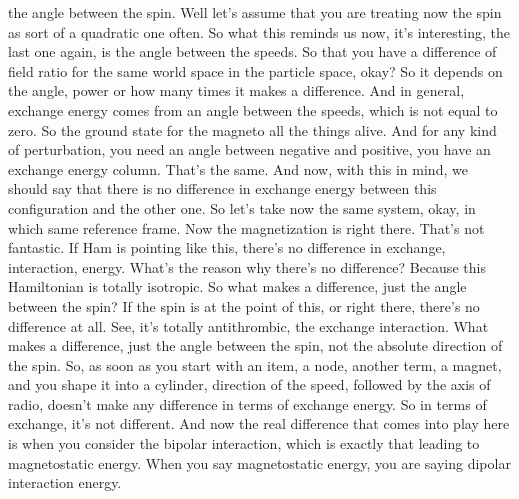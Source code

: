 the angle between the spin. Well let's assume that you are treating now the spin as sort of a quadratic one often. So what this reminds us now, it's interesting, the last one again, is the angle between the speeds. So that you have a difference of field ratio for the same world space in the particle space, okay? So it depends on the angle, power or how many times it makes a difference. And in general, exchange energy comes from an angle between the speeds, which is not equal to zero. So the ground state for the magneto all the things alive. And for any kind of perturbation, you need an angle between negative and positive, you have an exchange energy column. That's the same. And now, with this in mind, we should say that there is no difference in exchange energy between this configuration and the other one. So let's take now the same system, okay, in which same reference frame. Now the magnetization is right there. That's not fantastic. If Ham is pointing like this, there's no difference in exchange, interaction, energy. What's the reason why there's no difference? Because this Hamiltonian is totally isotropic. So what makes a difference, just the angle between the spin? If the spin is at the point of this, or right there, there's no difference at all. See, it's totally antithrombic, the exchange interaction. What makes a difference, just the angle between the spin, not the absolute direction of the spin. So, as soon as you start with an item, a node, another term, a magnet, and you shape it into a cylinder, direction of the speed, followed by the axis of radio, doesn't make any difference in terms of exchange energy. So in terms of exchange, it's not different. And now the real difference that comes into play here is when you consider the bipolar interaction, which is exactly that leading to magnetostatic energy. When you say magnetostatic energy, you are saying dipolar interaction energy.
